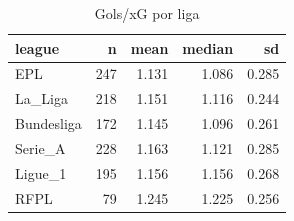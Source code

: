 \begin{table}

\caption{\label{tab:gols_xg_liga_g10}Gols/xG por liga}
\centering
\begin{tabular}[t]{lrrrr}
\toprule
league & n & mean & median & sd\\
\midrule
EPL & 247 & 1.131 & 1.086 & 0.285\\
La\_Liga & 218 & 1.151 & 1.116 & 0.244\\
Bundesliga & 172 & 1.145 & 1.096 & 0.261\\
Serie\_A & 228 & 1.163 & 1.121 & 0.285\\
Ligue\_1 & 195 & 1.156 & 1.156 & 0.268\\
\addlinespace
RFPL & 79 & 1.245 & 1.225 & 0.256\\
\bottomrule
\end{tabular}
\end{table}
